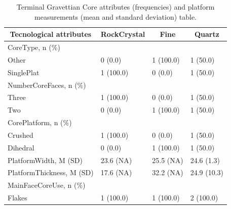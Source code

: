 \documentclass[12pt,twoside]{reedthesis}
\begin{document}
\begin{table}[!h]

\caption{\label{tab:unnamed-chunk-68}Phase 2 Elongated product measurements (width, length and thickness) with mean and standard deviation values.}
\centering
{}
\end{table}
\begin{table}[H]

\caption{\label{tab:unnamed-chunk-69}Terminal Gravettian Core attributes (frequencies) and platform measurements (mean and standard deviation) table.}
\centering
\begin{tabular}[t]{llll}
\toprule
\multicolumn{1}{c}{\textbf{Tecnological attributes}} & \multicolumn{1}{c}{\textbf{RockCrystal}} & \multicolumn{1}{c}{\textbf{Fine}} & \multicolumn{1}{c}{\textbf{Quartz}}\\
\midrule
CoreType, n (\%) &  &  & \\
Other & 0 (0.0) & 1 (100.0) & 1 (50.0)\\
SinglePlat & 1 (100.0) & 0 (0.0) & 1 (50.0)\\
NumberCoreFaces, n (\%) &  &  & \\
Three & 1 (100.0) & 0 (0.0) & 1 (50.0)\\
\addlinespace
Two & 0 (0.0) & 1 (100.0) & 1 (50.0)\\
CorePlatform, n (\%) &  &  & \\
Crushed & 1 (100.0) & 0 (0.0) & 1 (50.0)\\
Dihedral & 0 (0.0) & 1 (100.0) & 1 (50.0)\\
PlatformWidth, M (SD) & 23.6 (NA) & 25.5 (NA) & 24.6 (1.3)\\
\addlinespace
PlatformThickness, M (SD) & 17.6 (NA) & 32.2 (NA) & 24.9 (10.3)\\
MainFaceCoreUse, n (\%) &  &  & \\
Flakes & 1 (100.0) & 1 (100.0) & 2 (100.0)\\
\bottomrule
\end{tabular}
\end{table}
\end{document}
